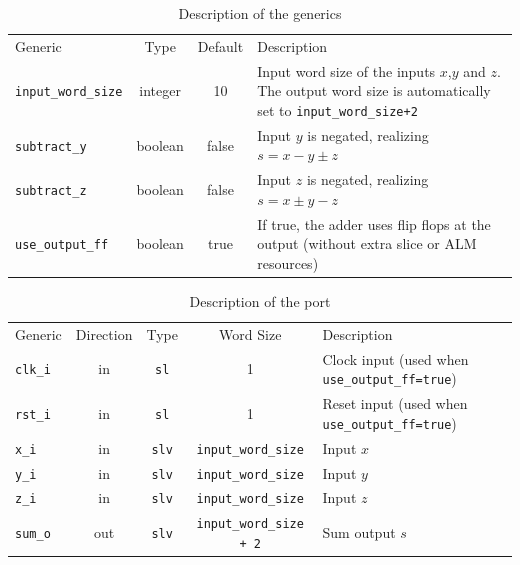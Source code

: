 \documentclass[a4paper,BCOR7mm,12pt,pointlessnumbers,bibtotoc]{scrartcl}
\begin{document}
\begin{table}[!h]
	\renewcommand{\arraystretch}{1.1}
	\caption{Description of the generics}
	\label{tab:generics}
	\centering
	\begin{tabular}{lccL{7cm}}
	  \toprule
	  Generic & Type & Default & Description\\
    \cmidrule(rl){1-1} \cmidrule(rl){2-2} \cmidrule(rl){3-3} \cmidrule(rl){4-4}
    \verb|input_word_size|  & integer & 10    & Input word size of the inputs $x$,$y$ and $z$. The output word size is automatically set to \verb|input_word_size+2|\\
    \verb|subtract_y|       & boolean & false & Input $y$ is negated, realizing $s = x - y \pm z$\\
    \verb|subtract_z|       & boolean & false & Input $z$ is negated, realizing $s = x \pm y - z$\\
    \verb|use_output_ff|    & boolean & true  & If true, the adder uses flip flops at the output (without extra slice or ALM resources)\\
    \bottomrule
   \end{tabular}
\end{table}

\begin{table}[!h]
	\renewcommand{\arraystretch}{1.1}
	\caption{Description of the port}
	\label{tab:port}
	\centering
	\begin{tabular}{lcccL{5cm}}
	  \toprule
	  Generic & Direction & Type & Word Size & Description\\
    \cmidrule(rl){1-1} \cmidrule(rl){2-2} \cmidrule(rl){3-3} \cmidrule(rl){4-4} \cmidrule(rl){5-5}
    \verb|clk_i| & in  & \verb|sl|        & 1                    & Clock input (used when \verb|use_output_ff=true|)\\
    \verb|rst_i| & in  & \verb|sl|        & 1                    & Reset input (used when \verb|use_output_ff=true|)\\
    \verb|x_i|   & in  & \verb|slv| & \verb|input_word_size|     & Input $x$\\
    \verb|y_i|   & in  & \verb|slv| & \verb|input_word_size|     & Input $y$\\
    \verb|z_i|   & in  & \verb|slv| & \verb|input_word_size|     & Input $z$\\
    \verb|sum_o| & out & \verb|slv| & \verb|input_word_size + 2| & Sum output $s$\\
    \bottomrule
   \end{tabular}
\end{table}
\end{document}
